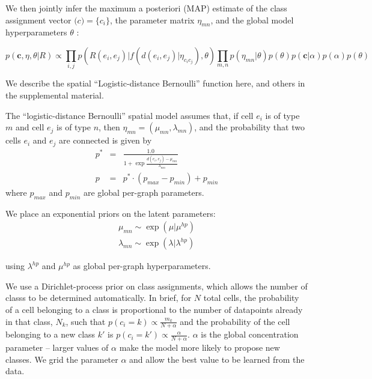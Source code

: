 \documentclass{nature}
\renewcommand{\vec}[1]{\mathbf{#1}}
\begin{document}
We then jointly infer the maximum a posteriori (MAP) estimate of the
class assignment vector $\vec(c) = \{c_i\}$, the parameter matrix $\eta_{mn}$, and
the global model hyperparameters $\theta$ :

\begin{equation}
  p(\vec{c}, \eta, \theta | R ) \propto \prod_{i, j} p(R(e_i, e_j) | f(d(e_i, e_j) | \eta_{c_ic_j}), \theta) \prod_{m, n} p(\eta_{mn} | \theta)  p(\theta) p(\vec{c} | \alpha) p(\alpha) p(\theta)
\end{equation}





We describe the spatial ``Logistic-distance Bernoulli''  function here,
and others in the supplemental material. 

The ``logistic-distance Bernoulli'' spatial model assumes that, if cell
$e_i$ is of type $m$ and cell $e_j$ is of type $n$, then $\eta_{mn}
= (\mu_{mn}, \lambda_{mn})$, and the probability that two cells $e_i$
and $e_j$ are connected is given by
\begin{eqnarray}
p^* &=& \frac{1.0}{1 + \exp \frac{d(e_i, e_j) - \mu_{mn}}{\lambda_{mn}}}\\
p &= & p^* \cdot (p_{max} - p_{min}) + p_{min}
\end{eqnarray}
where $p_{max}$ and $p_{min}$ are global per-graph parameters. 

We place an exponential priors on the latent parameters:
\begin{eqnarray}
 \mu_{mn} \sim \exp(\mu | \mu^{hp}) \\
\lambda_{mn} \sim \exp(\lambda | \lambda^{hp})
\end{eqnarray}

using  $\lambda^{hp}$ and $\mu^{hp}$ as global per-graph hyperparameters. 

We use a Dirichlet-process prior on class assignments, which allows
the number of classs to be determined automatically. In brief, for $N$
total cells, the probability of a cell belonging to a class is
proportional to the number of datapoints already in that class, $N_k$,
such that $p(c_i = k) \propto \frac{m_k}{N + \alpha}$ and the
probability of the cell belonging to a new class $k'$ is $p(c_i = k')
\propto \frac{\alpha}{N + \alpha}$. $\alpha$ is the global
concentration parameter -- larger values of $\alpha$ make the model
more likely to propose new classes. We grid the parameter $\alpha$ and
allow the best value to be learned from the data.
\end{document}
